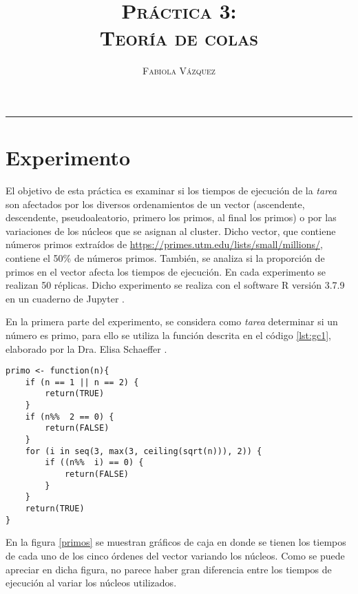 \documentclass[12pt,letterpaper]{article}
\title{\textsc{Práctica 3: \\Teoría de colas}}
\author{\textsc{Fabiola Vázquez}}
\begin{document}
\maketitle
\hrule
\section{Experimento}
El objetivo de esta práctica \cite{elisap3} es examinar si los tiempos de ejecución de la \textit{tarea} son afectados por los diversos ordenamientos de un vector (ascendente, descendente, pseudoaleatorio, primero los primos, al final los primos) o por las variaciones  de los núcleos que se asignan al cluster. Dicho vector, que contiene números primos extraídos de \url{https://primes.utm.edu/lists/small/millions/}, contiene el 50\% de números primos. También, se analiza si la proporción de primos en el vector afecta los tiempos de ejecución. En cada experimento se realizan 50 réplicas. Dicho experimento se realiza con el software R versión 3.7.9 \cite{R} en un cuaderno de Jupyter \cite{jupyter}.

En la primera parte del experimento, se considera como \textit{tarea} determinar si un número es primo, para ello se utiliza la función descrita en el código \ref{lst:gc1}, elaborado por la Dra. Elisa Schaeffer \cite{elisa}.
\begin{lstlisting}[label=lst:gc1,caption=Función para determinar si un número es primo., frame = single]
primo <- function(n){
    if (n == 1 || n == 2) {
        return(TRUE)
    }
    if (n%%  2 == 0) {
        return(FALSE)
    }
    for (i in seq(3, max(3, ceiling(sqrt(n))), 2)) {
        if ((n%%  i) == 0) {
            return(FALSE)
        }
    }
    return(TRUE)
}
\end{lstlisting} 
En la figura \ref{primos} se muestran gráficos de caja en donde se tienen los tiempos de cada uno de los cinco órdenes del vector variando los núcleos. Como se puede apreciar en dicha figura, no parece haber gran diferencia entre los tiempos de ejecución al variar los núcleos utilizados.
\end{document}
